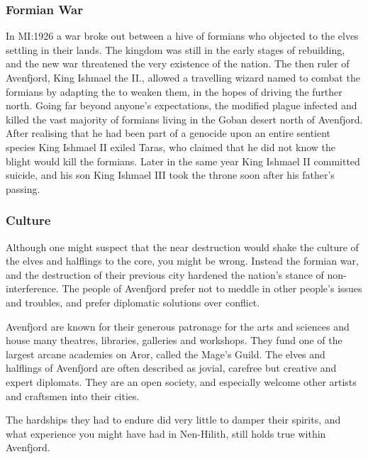\subsubsection{Formian War}
\label{sec:Formian War}

In MI:1926 a war broke out between a hive of formians who objected to the
elves settling in their lands. The kingdom was still in the early stages of
rebuilding, and the new war threatened the very existence of the nation. The
then ruler of Avenfjord, King Ishmael the II., allowed a travelling wizard
named  to combat the formians by adapting the
 to weaken them, in the hopes of driving the further
north. Going far beyond anyone's expectations, the modified plague infected
and killed the vast majority of formians living in the Goban desert north of
Avenfjord. After realising that he had been part of a genocide upon an entire
sentient species King Ishmael II exiled Taras, who claimed that he did not
know the blight would kill the formians. Later in the same year King Ishmael
II committed suicide, and his son King Ishmael III took the throne soon after
his father's passing.


\subsubsection{Culture}

Although one might suspect that the near destruction would shake the culture
of the elves and halflings to the core, you might be wrong. Instead the
formian war, and the destruction of their previous city hardened the nation's
stance of non-interference. The people of Avenfjord prefer not to meddle in
other people's issues and troubles, and prefer diplomatic solutions over
conflict.

Avenfjord are known for their generous patronage for the arts and sciences and
house many theatres, libraries, galleries and workshops. They fund one of the
largest arcane academies on Aror, called the Mage's Guild. The elves and
halflings of Avenfjord are often described as jovial, carefree but creative
and expert diplomats. They are an open society, and especially welcome other
artists and craftsmen into their cities.

The hardships they had to endure did very little to damper their spirits, and
what experience you might have had in Nen-Hilith, still holds true within
Avenfjord.

